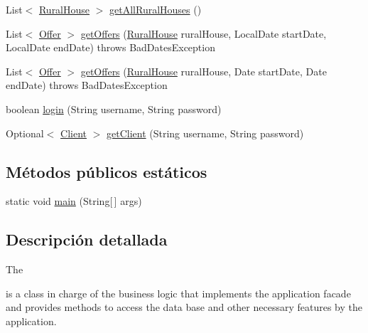 \begin{DoxyCompactItemize}
\item 
List$<$ \mbox{\hyperlink{classcom_1_1ruralhousejsf_1_1domain_1_1_rural_house}{Rural\+House}} $>$ \mbox{\hyperlink{classcom_1_1ruralhousejsf_1_1business_logic_1_1_application_facade_impl_a22bb7d4b98f51470315a81cd0d6f2290}{get\+All\+Rural\+Houses}} ()
\item 
List$<$ \mbox{\hyperlink{classcom_1_1ruralhousejsf_1_1domain_1_1_offer}{Offer}} $>$ \mbox{\hyperlink{classcom_1_1ruralhousejsf_1_1business_logic_1_1_application_facade_impl_a131acc04c80b3860f98d713d3a8ea5a5}{get\+Offers}} (\mbox{\hyperlink{classcom_1_1ruralhousejsf_1_1domain_1_1_rural_house}{Rural\+House}} rural\+House, Local\+Date start\+Date, Local\+Date end\+Date)  throws Bad\+Dates\+Exception 
\item 
List$<$ \mbox{\hyperlink{classcom_1_1ruralhousejsf_1_1domain_1_1_offer}{Offer}} $>$ \mbox{\hyperlink{classcom_1_1ruralhousejsf_1_1business_logic_1_1_application_facade_impl_a178d3964ff871edce1f5a207331319ed}{get\+Offers}} (\mbox{\hyperlink{classcom_1_1ruralhousejsf_1_1domain_1_1_rural_house}{Rural\+House}} rural\+House, Date start\+Date, Date end\+Date)  throws Bad\+Dates\+Exception 
\item 
boolean \mbox{\hyperlink{classcom_1_1ruralhousejsf_1_1business_logic_1_1_application_facade_impl_a7af883dece6a0de1e1be2b83e3d4a23f}{login}} (String username, String password)
\item 
Optional$<$ \mbox{\hyperlink{classcom_1_1ruralhousejsf_1_1domain_1_1_client}{Client}} $>$ \mbox{\hyperlink{classcom_1_1ruralhousejsf_1_1business_logic_1_1_application_facade_impl_a249a902aa3507a04fb15ab5fcf1f082c}{get\+Client}} (String username, String password)
\end{DoxyCompactItemize}
\subsection*{Métodos públicos estáticos}
\begin{DoxyCompactItemize}
\item 
static void \mbox{\hyperlink{classcom_1_1ruralhousejsf_1_1business_logic_1_1_application_facade_impl_a19d9b0706fe39437efc379c3bc747e06}{main}} (String\mbox{[}$\,$\mbox{]} args)
\end{DoxyCompactItemize}


\subsection{Descripción detallada}
The
\begin{DoxyCode}{0}
\end{DoxyCode}
 is a class in charge of the business logic that implements the application facade and provides methods to access the data base and other necessary features by the application. 


